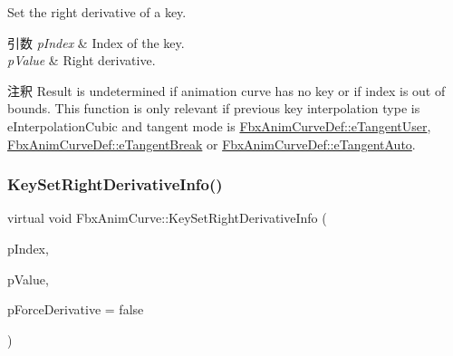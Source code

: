 Set the right derivative of a key. 
\begin{DoxyParams}{引数}
{\em p\+Index} & Index of the key. \\
\hline
{\em p\+Value} & Right derivative. \\
\hline
\end{DoxyParams}
\begin{DoxyRemark}{注釈}
Result is undetermined if animation curve has no key or if index is out of bounds. This function is only relevant if previous key interpolation type is e\+Interpolation\+Cubic and tangent mode is \hyperlink{class_fbx_anim_curve_def_ac810ccc5ca0527704ab5175479964b87a199cb16b2c861b12c334093ce796cb86}{Fbx\+Anim\+Curve\+Def\+::e\+Tangent\+User}, \hyperlink{class_fbx_anim_curve_def_ac810ccc5ca0527704ab5175479964b87ab4d85a1a0474226be85b885518f6c847}{Fbx\+Anim\+Curve\+Def\+::e\+Tangent\+Break} or \hyperlink{class_fbx_anim_curve_def_ac810ccc5ca0527704ab5175479964b87a56e3bad364851277281e94e81327dd25}{Fbx\+Anim\+Curve\+Def\+::e\+Tangent\+Auto}. 
\end{DoxyRemark}
\mbox{\label{class_fbx_anim_curve_a609a6e5f3ee69b04e46e75597cc5e1cf}} 
\subsubsection{\texorpdfstring{Key\+Set\+Right\+Derivative\+Info()}{KeySetRightDerivativeInfo()}}
{\footnotesize\ttfamily virtual void Fbx\+Anim\+Curve\+::\+Key\+Set\+Right\+Derivative\+Info (\begin{DoxyParamCaption}\item[{int}]{p\+Index,  }\item[{const \hyperlink{struct_fbx_anim_curve_tangent_info}{Fbx\+Anim\+Curve\+Tangent\+Info} \&}]{p\+Value,  }\item[{bool}]{p\+Force\+Derivative = {\ttfamily false} }\end{DoxyParamCaption})\hspace{0.3cm}{\ttfamily [pure virtual]}}


